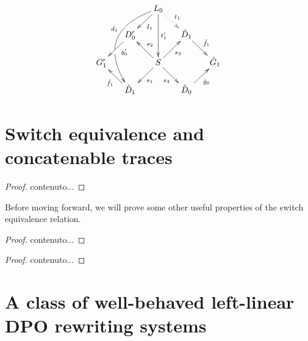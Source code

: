 \[\xymatrix@R=15pt@C=15pt{&&L_ 0\ar[dl]^{I_1} \ar@/_1.2cm/[dddl]_(.4){d_1}|(.63)\hole\ar[dd]^{t'_1} \ar@{.>}[dr]^{t_1}\\&D'_0 \ar[dl]^(.4){g'_0}&&\tilde{D}_1 \ar[dr]^{\tilde{f}_1}\\G'_1 && S\ar[dr]_{s_4} \ar[ur]_{s_3}\ar[dl]^{s_1} \ar[ul]_{s_2}&&\hat{G}_1\\& \hat{D}_1 \ar[ul]^{\hat{f}_1}&&\hat{D}_0 \ar[ur]_{\hat{g}_0}}\]

\section{Switch equivalence and concatenable traces}

\begin{lemma}
\end{lemma}
\begin{proof}
	contenuto...
\end{proof}
\begin{definition}
\end{definition}

Before moving forward, we will prove some other useful properties of the switch equivalence relation.

\begin{lemma}
\end{lemma}
\begin{proof}
	contenuto...
\end{proof}


\begin{theorem}
\end{theorem}
\begin{proof}
	contenuto...
\end{proof}




\section{A class of well-behaved left-linear DPO rewriting systems}
